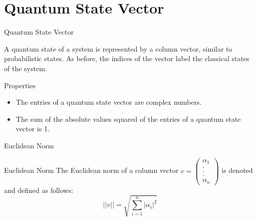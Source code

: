 \documentclass[12pt, aspectratio=169]{beamer}
\begin{document}
\section{Quantum State Vector}
\begin{frame}{Quantum State Vector}
\begin{block}{}
A quantum state of a system is represented by a column vector, similar to probabilistic states. As before, the indices of the vector label the classical states of the system.
\end{block}
    \begin{block}{Properties}
        \begin{itemize}
            \item The entries of a quantum state vector are complex numbers.
            \item The sum of the absolute values squared of the entries of a quantum state vector is 1.
        \end{itemize}
    \end{block}
\end{frame}

\begin{frame}{Euclidean Norm}
    \begin{block}{Euclidean Norm}
        The Euclidean norm of a column vector $v=\begin{pmatrix}\alpha_{1}\\ .\\ .\\ .\\ \alpha_{n}\end{pmatrix}$ is denoted and defined as follows:
        \[
        ||v|| = \sqrt{\sum_{i=1}^{n} |\alpha_{i}|^2}
        \]
    \end{block}
\end{frame}
\end{document}
